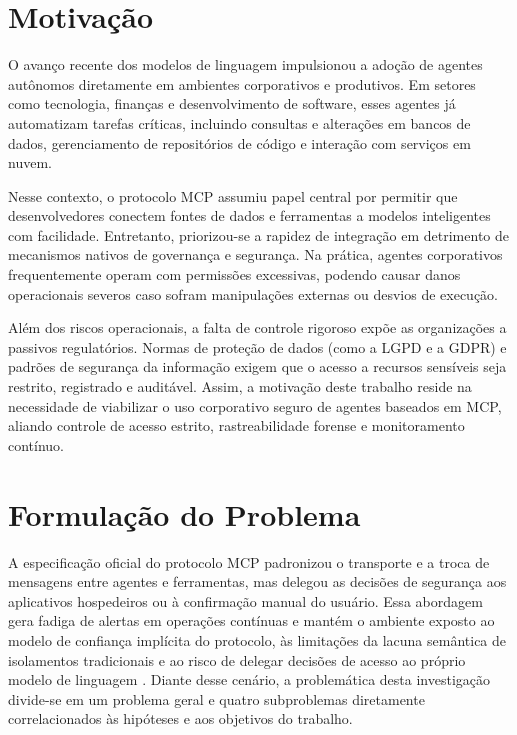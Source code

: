 \section{Motivação}
\label{sec:motivacao}

O avanço recente dos modelos de linguagem impulsionou a adoção de agentes autônomos diretamente em ambientes corporativos e produtivos. Em setores como tecnologia, finanças e desenvolvimento de software, esses agentes já automatizam tarefas críticas, incluindo consultas e alterações em bancos de dados, gerenciamento de repositórios de código e interação com serviços em nuvem.

Nesse contexto, o protocolo MCP assumiu papel central por permitir que desenvolvedores conectem fontes de dados e ferramentas a modelos inteligentes com facilidade. Entretanto, priorizou-se a rapidez de integração em detrimento de mecanismos nativos de governança e segurança. Na prática, agentes corporativos frequentemente operam com permissões excessivas, podendo causar danos operacionais severos caso sofram manipulações externas ou desvios de execução.

Além dos riscos operacionais, a falta de controle rigoroso expõe as organizações a passivos regulatórios. Normas de proteção de dados (como a LGPD e a GDPR) e padrões de segurança da informação exigem que o acesso a recursos sensíveis seja restrito, registrado e auditável. Assim, a motivação deste trabalho reside na necessidade de viabilizar o uso corporativo seguro de agentes baseados em MCP, aliando controle de acesso estrito, rastreabilidade forense e monitoramento contínuo.

\section{Formulação do Problema}
\label{sec:problematica}

A especificação oficial do protocolo MCP \cite{hou2025mcp,singh2026mcpsecure} padronizou o transporte e a troca de mensagens entre agentes e ferramentas, mas delegou as decisões de segurança aos aplicativos hospedeiros ou à confirmação manual do usuário. Essa abordagem gera fadiga de alertas em operações contínuas e mantém o ambiente exposto ao modelo de confiança implícita do protocolo, às limitações da lacuna semântica de isolamentos tradicionais \cite{buhler2026agentbound} e ao risco de delegar decisões de acesso ao próprio modelo de linguagem \cite{zhang2025acfix}. Diante desse cenário, a problemática desta investigação divide-se em um problema geral e quatro subproblemas diretamente correlacionados às hipóteses e aos objetivos do trabalho.

